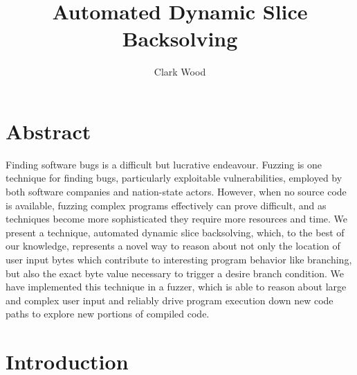 \documentclass[11pt,expanded,copyright]{fsuthesis}
\title{Automated Dynamic Slice Backsolving}
\author{Clark Wood}
\begin{document}
\frontmatter
\maketitle
\makecommitteepage



\tableofcontents
\listoffigures




\mainmatter

%

\chapter{Abstract}

Finding software bugs is a difficult but lucrative endeavour. Fuzzing is one technique for finding bugs, particularly exploitable vulnerabilities, employed by both software companies and nation-state actors. However, when no source code is available, fuzzing complex programs effectively can prove difficult, and as techniques become more sophisticated they require more resources and time. We present a technique, automated dynamic slice backsolving, which, to the best of our knowledge, represents a novel way to reason about not only the location of user input bytes which contribute to interesting program behavior like branching, but also the exact byte value necessary to trigger a desire branch condition. We have implemented this technique in a fuzzer, which is able to reason about large and complex user input and reliably drive program execution down new code paths to explore new portions of compiled code.
 
\chapter{Introduction}
\end{document}
